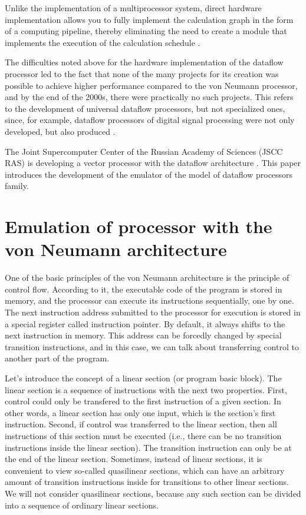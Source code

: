 \documentclass[
11pt,%
tightenlines,%
twoside,%
onecolumn,%
nofloats,%
nobibnotes,%
nofootinbib,%
superscriptaddress,%
noshowpacs,%
centertags]%
{revtex4}
\begin{document}
Unlike the implementation of a multiprocessor system, direct hardware implementation allows you to fully implement the calculation graph in the form of a computing pipeline, thereby eliminating the need to create a module that implements the execution of the calculation schedule \cite{popov}.

The difficulties noted above for the hardware implementation of the dataflow processor led to the fact that none of the many projects for its creation was possible to achieve higher performance compared to the von Neumann processor, and by the end of the 2000s, there were practically no such projects.
This refers to the development of universal dataflow processors, but not specialized ones, since, for example, dataflow processors of digital signal processing were not only developed, but also produced \cite{terada}.

The Joint Supercomputer Center of the Russian Academy of Sciences (JSCC RAS) is developing a vector processor with the dataflow architecture \cite{vpp}.
This paper introduces the development of the emulator of the model of dataflow processors family. 


\section{Emulation of processor with the von Neumann architecture}

One of the basic principles of the von Neumann architecture is the principle of control flow.
According to it, the executable code of the program is stored in memory, and the processor can execute its instructions sequentially, one by one.
The next instruction address submitted to the processor for execution is stored in a special register called instruction pointer.
By default, it always shifts to the next instruction in memory.
This address can be forcedly changed by special transition instructions, and in this case, we can talk about transferring control to another part of the program.

Let's introduce the concept of a linear section (or program basic block).
The linear section is a sequence of instructions with the next two properties.
First, control could only be transfered to the first instruction of a given section.
In other words, a linear section has only one input, which is the section's first  instruction.
Second, if control was transferred to the linear section, then all instructions of this section must be executed (i.e., there can be no transition instructions inside the linear section).
The transition instruction can only be at the end of the linear section.
Sometimes, instead of linear sections, it is convenient to view so-called quasilinear sections, which can have an arbitrary amount of transition instructions inside for transitions to other linear sections.
We will not consider quasilinear sections, because any such section can be divided into a sequence of ordinary linear sections.
\end{document}
